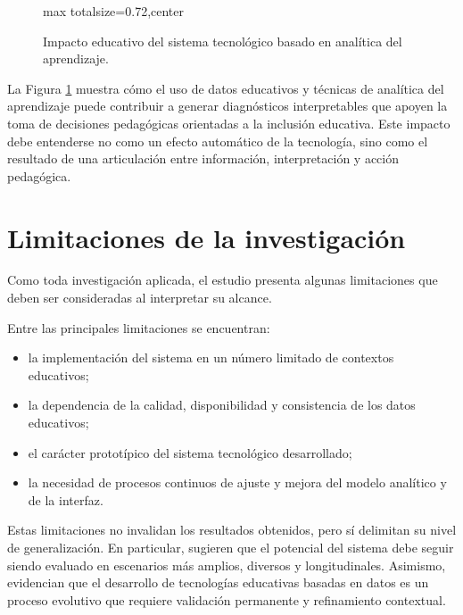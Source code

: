 \begin{refsection}
\begin{figure}[htbp]
\begin{adjustbox}{max totalsize={\textwidth}{0.72\textheight},center}
\end{adjustbox}
\caption{Impacto educativo del sistema tecnológico basado en analítica del aprendizaje.}
\label{fig:impacto-sistema}
\end{figure}

La Figura \ref{fig:impacto-sistema} muestra cómo el uso de datos educativos y técnicas de analítica del aprendizaje puede contribuir a generar diagnósticos interpretables que apoyen la toma de decisiones pedagógicas orientadas a la inclusión educativa. Este impacto debe entenderse no como un efecto automático de la tecnología, sino como el resultado de una articulación entre información, interpretación y acción pedagógica.

\section{Limitaciones de la investigación}

Como toda investigación aplicada, el estudio presenta algunas limitaciones que deben ser consideradas al interpretar su alcance.

Entre las principales limitaciones se encuentran:

\begin{itemize}
\item la implementación del sistema en un número limitado de contextos educativos;
\item la dependencia de la calidad, disponibilidad y consistencia de los datos educativos;
\item el carácter prototípico del sistema tecnológico desarrollado;
\item la necesidad de procesos continuos de ajuste y mejora del modelo analítico y de la interfaz.
\end{itemize}

Estas limitaciones no invalidan los resultados obtenidos, pero sí delimitan su nivel de generalización. En particular, sugieren que el potencial del sistema debe seguir siendo evaluado en escenarios más amplios, diversos y longitudinales. Asimismo, evidencian que el desarrollo de tecnologías educativas basadas en datos es un proceso evolutivo que requiere validación permanente y refinamiento contextual.


\end{refsection}
